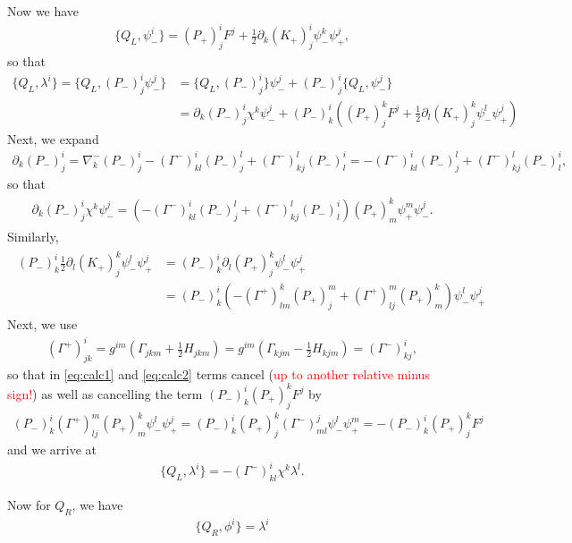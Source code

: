 \documentclass{article}
\newcommand{\p}{\partial}
\newcommand{\n}{\nabla}
\theoremstyle{definition}
\theoremstyle{definition}
\theoremstyle{remark}
\begin{document}
Now we have
\begin{align*}
\{Q_L,\psi_-^i\}=(P_+)^i_jF^j+\frac{1}{2}\p_k(K_+)^i_j\psi^k_-\psi_+^j,
\end{align*}
so that
\begin{align*}
\{Q_L,\lambda^i\}=\{Q_L,(P_-)^i_j\psi_-^j\}&=\{Q_L,(P_-)^i_j\}\psi_-^j+(P_-)^i_j\{Q_L,\psi_-^j\}\\
&=\p_k(P_-)^i_j\chi^k\psi_-^j+(P_-)^i_k((P_+)^k_jF^j+\frac{1}{2}\p_l(K_+)^k_j\psi^l_-\psi_+^j)
\end{align*}
Next, we expand
\begin{align*}
\p_k(P_-)^i_j=\n^-_k(P_-)^i_j-(\Gamma^-)^i_{kl}(P_-)^l_j+(\Gamma^-)^l_{kj}(P_-)^i_l=-(\Gamma^-)^i_{kl}(P_-)^l_j+(\Gamma^-)^l_{kj}(P_-)^i_l,
\end{align*}
so that
\begin{align}\label{eq:calc1}
\begin{aligned}
\p_k(P_-)^i_j\chi^k\psi_-^j=(-(\Gamma^-)^i_{kl}(P_-)^l_j+(\Gamma^-)^l_{kj}(P_-)^i_l)(P_+)^k_m\psi_+^m\psi_-^j.
\end{aligned}
\end{align}
Similarly,
\begin{align}\label{eq:calc2}
\begin{aligned}
(P_-)^i_k\frac{1}{2}\p_l(K_+)^k_j\psi^l_-\psi_+^j&=(P_-)^i_k\p_l(P_+)^k_j\psi^l_-\psi_+^j\\
&=(P_-)^i_k(-(\Gamma^+)^k_{lm}(P_+)^m_j+(\Gamma^+)^m_{lj}(P_+)^k_m)\psi^l_-\psi_+^j
\end{aligned}
\end{align}
Next, we use
\begin{align*}
(\Gamma^+)^i_{jk}=g^{im}(\Gamma_{jkm}+\frac{1}{2}H_{jkm})=g^{im}(\Gamma_{kjm}-\frac{1}{2}H_{kjm})=(\Gamma^-)^i_{kj},
\end{align*}
so that in \eqref{eq:calc1} and \eqref{eq:calc2} terms cancel (\textcolor{red}{up to another relative minus sign!}) as well as cancelling the term $(P_-)^i_k(P_+)^k_jF^j$ by
\begin{align*}
(P_-)^i_k(\Gamma^+)^m_{lj}(P_+)^k_m\psi^l_-\psi_+^j=(P_-)^i_k(P_+)^k_j(\Gamma^-)^j_{ml}\psi^l_-\psi_+^m=-(P_-)^i_k(P_+)^k_jF^j
\end{align*}
and we arrive at
\begin{align*}
\{Q_L,\lambda^i\}=-(\Gamma^-)^i_{kl}\chi^k\lambda^l.
\end{align*}



Now for $Q_R$, we have
\begin{align*}
\{Q_R,\phi^i\}=\lambda^i
\end{align*}
\end{document}
